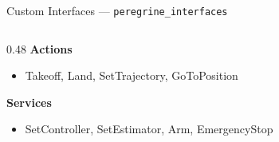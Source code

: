 \documentclass[aspectratio=169, 10pt]{beamer}
\begin{document}
\begin{frame}{Custom Interfaces --- \texttt{peregrine\_interfaces}}
\begin{columns}[T]
\begin{column}{0.48\textwidth}
\vspace{0.2em}
\textbf{Actions}
\begin{itemize}\scriptsize
  \item Takeoff, Land, SetTrajectory, GoToPosition
\end{itemize}

\vspace{0.2em}
\textbf{Services}
\begin{itemize}\scriptsize
  \item SetController, SetEstimator, Arm, EmergencyStop
\end{itemize}
\end{column}
\end{columns}
\end{frame}

\end{document}
